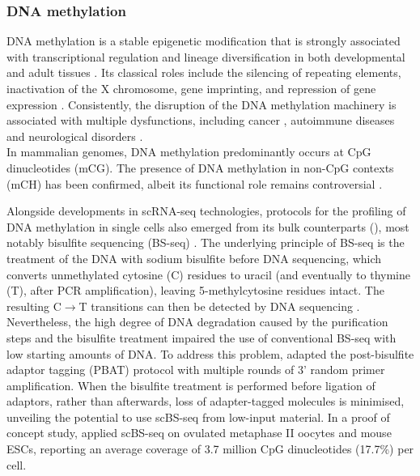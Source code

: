 \subsubsection{DNA methylation} \label{section:dna_methylation}
DNA methylation is a stable epigenetic modification that is strongly associated with transcriptional regulation and lineage diversification in both developmental and adult tissues \cite{Jin2018, Harrison2011, Lee2014, Smith2013}. Its classical roles include the silencing of repeating elements, inactivation of the X chromosome, gene imprinting, and repression of gene expression \cite{Jones2012}. Consistently, the disruption of the DNA methylation machinery is associated with multiple dysfunctions, including cancer \cite{Baylin2011}, autoimmune diseases \cite{Liu2013} and neurological disorders \cite{Amir1999}.\\
In mammalian genomes, DNA methylation predominantly occurs at CpG dinucleotides (mCG). The presence of DNA methylation in non-CpG contexts (mCH) has been confirmed, albeit its functional role remains controversial \cite{He2015, Ramsahoye2000, Lister2009}.

Alongside developments in scRNA-seq technologies, protocols for the profiling of DNA methylation in single cells also emerged from its bulk counterparts (), most notably bisulfite sequencing (BS-seq) \cite{Smallwood2014,Guo2013,Gravina2016,Farlik2015}. The underlying principle of BS-seq is the treatment of the DNA with sodium bisulfite before DNA sequencing, which converts unmethylated cytosine (C) residues to uracil (and eventually to thymine (T), after PCR amplification), leaving 5-methylcytosine residues intact. The resulting C$\to$T transitions can then be detected by DNA sequencing \cite{Frommer1992,Clark2016,Clark2017}. Nevertheless, the high degree of DNA degradation caused by the purification steps and the bisulfite treatment impaired the use of conventional BS-seq with low starting amounts of DNA. To address this problem, \cite{Smallwood2014} adapted the post-bisulfite adaptor tagging (PBAT) protocol with multiple rounds of 3' random primer amplification. When the bisulfite treatment is performed before ligation of adaptors, rather than afterwards, loss of adapter-tagged molecules is minimised, unveiling the potential to use scBS-seq from low-input material. In a proof of concept study, \cite{Smallwood2014} applied scBS-seq on ovulated metaphase II oocytes and mouse ESCs, reporting an average coverage of 3.7 million CpG dinucleotides (17.7\%) per cell.

